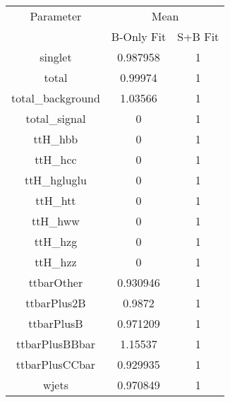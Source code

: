 \begin{table}
\centering

\begin{tabular}{ccc}
\toprule
Parameter 	& \multicolumn{2}{c}{Mean}\\
 	& B-Only Fit & S+B Fit\\
\midrule
singlet 	& \num{0.987958} 	& \num{1}\\
total 	& \num{0.99974} 	& \num{1}\\
total\_background 	& \num{1.03566} 	& \num{1}\\
total\_signal 	& \num{0} 	& \num{1}\\
ttH\_hbb 	& \num{0} 	& \num{1}\\
ttH\_hcc 	& \num{0} 	& \num{1}\\
ttH\_hgluglu 	& \num{0} 	& \num{1}\\
ttH\_htt 	& \num{0} 	& \num{1}\\
ttH\_hww 	& \num{0} 	& \num{1}\\
ttH\_hzg 	& \num{0} 	& \num{1}\\
ttH\_hzz 	& \num{0} 	& \num{1}\\
ttbarOther 	& \num{0.930946} 	& \num{1}\\
ttbarPlus2B 	& \num{0.9872} 	& \num{1}\\
ttbarPlusB 	& \num{0.971209} 	& \num{1}\\
ttbarPlusBBbar 	& \num{1.15537} 	& \num{1}\\
ttbarPlusCCbar 	& \num{0.929935} 	& \num{1}\\
wjets 	& \num{0.970849} 	& \num{1}\\
\bottomrule
\end{tabular}
\end{table}